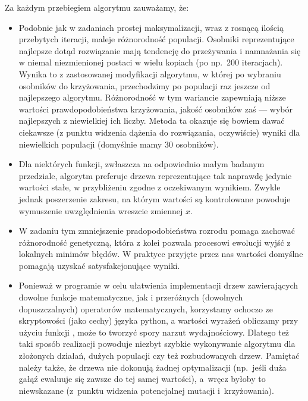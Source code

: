 \documentclass{classrep2}
\begin{document}
Za każdym przebiegiem algorytmu zauważamy, że:
\begin{itemize}
  \item Podobnie jak w zadaniach prostej maksymalizacji, wraz z rosnącą ilością przebytych iteracji, maleje różnorodność populacji. Osobniki reprezentujące najlepsze dotąd rozwiązanie mają tendencję do przeżywania i namnażania się w niemal niezmienionej postaci w wielu kopiach (po np.~200 iteracjach). Wynika to z zastosowanej modyfikacji algorytmu, w której po wybraniu osobników do krzyżowania, przechodzimy po populacji raz jeszcze od najlepszego algorytmu. Różnorodność w tym wariancie zapewniają niższe wartości prawdopodobieństwa krzyżowania, jakość osobników zaś --- wybór najlepszych z niewielkiej ich liczby. Metoda ta okazuje się bowiem dawać ciekawsze (z punktu widzenia dążenia do rozwiązania, oczywiście) wyniki dla niewielkich populacji (domyślnie mamy 30 osobników).
  \item Dla niektórych funkcji, zwłaszcza na odpowiednio małym badanym przedziale, algorytm preferuje drzewa reprezentujące tak naprawdę jedynie wartości stałe, w przybliżeniu zgodne z oczekiwanym wynikiem. Zwykle jednak poszerzenie zakresu, na którym wartości są kontrolowane powoduje wymuszenie uwzględnienia wreszcie zmiennej $x$.
  \item W zadaniu tym zmniejszenie pradopodobieństwa rozrodu pomaga zachować różnorodność genetyczną, która z kolei pozwala procesowi ewolucji wyjść z lokalnych minimów błędów. W praktyce przyjęte przez nas wartości domyślne pomagają uzyskać satysfakcjonujące wyniki.
  \item Ponieważ w programie w celu ułatwienia implementacji drzew zawierających dowolne funkcje matematyczne, jak i przeróżnych (dowolnych dopuszczalnych) operatorów matematycznych, korzystamy ochoczo ze skryptowości (jako cechy) języka python, a wartości wyrażeń obliczamy przy użyciu funkcji , może to tworzyć spory narzut wydajnościowy. Dlatego też taki sposób realizacji powoduje niezbyt szybkie wykonywanie algorytmu dla złożonych działań, dużych populacji czy też rozbudowanych drzew. Pamiętać należy także, że drzewa nie dokonują żadnej optymalizacji (np.~jeśli duża gałąź ewaluuje się zawsze do tej samej wartości), a~wręcz byłoby to niewskazane (z~punktu widzenia potencjalnej mutacji i~krzyżowania).
\end{itemize}
\end{document}
